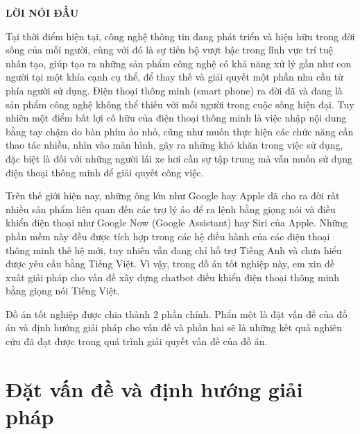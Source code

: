 \documentclass[12pt]{report}
\begin{document}
\newpage
\tableofcontents

\newpage
\listoffigures
{}

\newpage
\listoftables
{}

\newpage
\lstlistoflistings
{}

\newpage
\begin{center}
{\large \textbf{LỜI NÓI ĐẦU}}
\end{center}
Tại thời điểm hiện tại, công nghệ thông tin đang phát triển và hiện hữu trong đời sống của mỗi người, cùng với đó là sự tiến bộ vượt bậc trong lĩnh vực trí tuệ nhân tạo, giúp tạo ra những sản phẩm công nghệ có khả năng xử lý gần như con người tại một khía cạnh cụ thể, để thay thế và giải quyết một phần nhu cầu từ phía người sử dụng. Điện thoại thông minh (smart phone) ra đời đã và đang là sản phẩm công nghệ không thể thiếu với mỗi người trong cuộc sống hiện đại. Tuy nhiên một điểm bất lợi cố hữu của điện thoại thông minh là việc nhập nội dung bằng tay chậm do bàn phím ảo nhỏ, cũng như muốn thực hiện các chức năng cần thao tác nhiều, nhìn vào màn hình, gây ra những khó khăn trong việc sử dụng, đặc biệt là đối với những người lái xe hơi cần sự tập trung mà vẫn muốn sử dụng điện thoại thông minh để giải quyết công việc.

Trên thế giới hiện nay, những ông lớn như Google hay Apple đã cho ra đời rất nhiều sản phẩm liên quan đến các trợ lý ảo để ra lệnh bằng giọng nói và điều khiển điện thoại như Google Now (Google Assistant) hay Siri của Apple. Những phần mềm này đều được tích hợp trong các hệ điều hành của các điện thoại thông minh thế hệ mới, tuy nhiên vẫn đang chỉ hỗ trợ Tiếng Anh và chưa hiểu được yêu cầu bằng Tiếng Việt. Vì vậy, trong đồ án tốt nghiệp này, em xin đề xuất giải pháp cho vấn đề xây dựng chatbot điều khiển điện thoại thông minh bằng giọng nói Tiếng Việt.

Đồ án tốt nghiệp được chia thành 2 phần chính. Phẩn một là đặt vấn đề của đồ án và định hướng giải pháp cho vấn đề và phần hai sẽ là những kết quả nghiên cứu đã đạt được trong quá trình giải quyết vấn đề của đồ án.

\newpage
\setcounter{page}{1}

\newcommand{\alice}{A.L.I.C.E}

\part{Đặt vấn đề và định hướng giải pháp}
\end{document}
